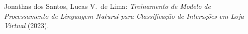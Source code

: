 \documentclass[a4paper]{article}
\begin{document}
        


    \begin{thebibliography}{9}
         Jonathas dos Santos, Lucas V.~de Lima: \emph{Treinamento
            de Modelo de Processamento de Linguagem Natural para Classificação
            de Interações em Loja Virtual} (2023).
    \end{thebibliography}




        
\end{document}

